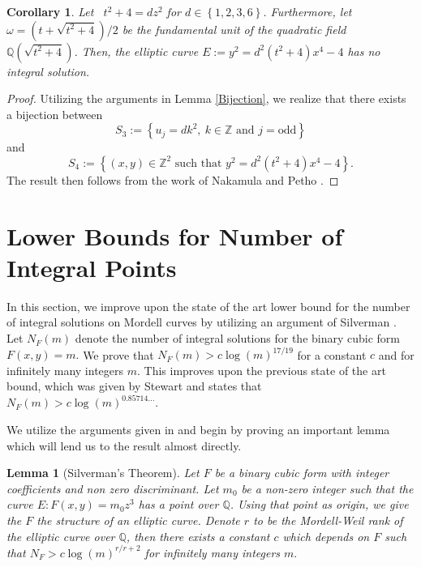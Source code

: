 \documentclass[12pt]{amsart}
\theoremstyle{plain}
\newtheorem{lemma}[thm]{Lemma}
\newtheorem{cor}[thm]{Corollary}
\theoremstyle{definition}
\theoremstyle{remark}
\numberwithin{equation}{section}
\numberwithin{thm}{section}
\theoremstyle{named}
\theoremstyle{named}
\begin{document}
\begin{cor}
    Let \ $t^2 + 4 = dz^2$ for $d \in \left\{1, 2, 3,6 \right\}$. Furthermore, let $\omega = \left( t + \sqrt{t^2 + 4}\right)/2$ be the fundamental unit of the quadratic field $\mathbb{Q}(\sqrt{t^2 + 4})$. Then, the elliptic curve $E:= y^2 =  d^2(t^2 + 4)x^4 - 4$ has no integral solution. 
\end{cor}
\begin{proof}\label{StrongBijection}
Utilizing the arguments in Lemma \ref{Bijection}, we realize that there exists a bijection between $$S_3:= \left\{u_j = dk^2,\ k \in \mathbb{Z} \text{ and } j = \text{odd} \right\}$$ and $$ S_4 := \left\{(x,y) \in \mathbb{Z}^2 \text{ such that } y^2 = d^2(t^2 + 4)x^4 - 4 \right\}.$$ The result then follows from the work of {Nakamula and Petho} \cite{NakamulaPethő+1998+409+422}. 
\end{proof}
\section{Lower Bounds for Number of Integral Points}
In this section, we improve upon the state of the art lower bound for the number of integral solutions on Mordell curves by utilizing an argument of {Silverman} \cite{Silverman1983}. Let $N_{F}(m)$ denote the number of integral solutions for the binary cubic form $F(x,y) = m.$ We prove that $N_F(m) > c \log (m)^{17/19}$ for a constant $c$ and for infinitely many integers $m.$ This improves upon the previous state of the art bound, which was given by {Stewart}\cite{numdam} and states that $N_F(m) > c \log (m)^{0.85714\ldots}.$

We utilize the arguments given in \cite{numdam} and begin by proving an important lemma which will lend us to the result almost directly.
\begin{lemma}[{Silverman's Theorem}]\label{Silverman's Theorem}
    Let $F$ be a binary cubic form with integer coefficients and non zero discriminant. Let $m_0 $ be a non-zero integer such that the curve $E : F(x,y) = m_0 z^3$ has a point over $\mathbb{Q}$. Using that point as origin, we give the $F$ the structure of an elliptic curve. Denote $r$ to be the Mordell-Weil rank of the elliptic curve over $\mathbb{Q}$, then there exists a constant $c$ which depends on $F$ such that $N_{F} > c \log{(m)}^{r/r+2}$ for infinitely many integers $m.$
\end{lemma}
\end{document}
